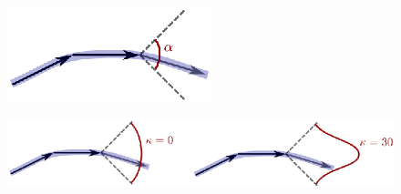             \begin{figure}
                \centering
                \includegraphics[height=0.1\textheight]{angleThreshold}
                \caption{}
            \end{figure}


            \begin{figure}
                \centering
                \includegraphics[height=0.1\textheight]{concentration}
                \caption{}
            \end{figure}

